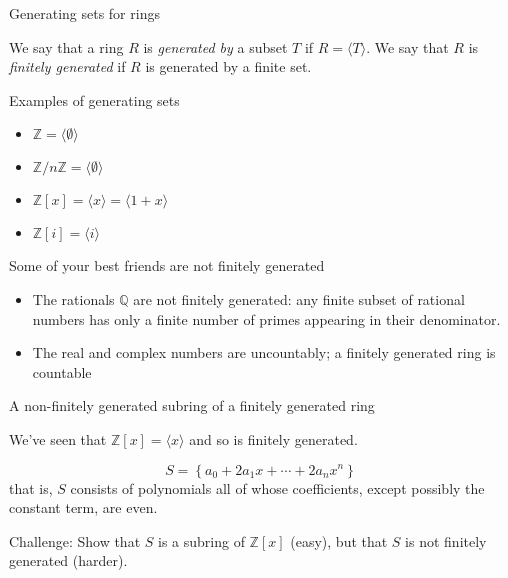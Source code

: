 \documentclass{beamer}
\begin{document}
\begin{frame}{Generating sets for rings}

\begin{definition}
We say that a ring $R$ is \emph{generated by} a subset $T$ if $R=\langle T\rangle$.  We say that $R$ is \emph{finitely generated} if $R$ is generated by a finite set.
\end{definition}

\end{frame}


\begin{frame}{Examples of generating sets}
\begin{itemize}
\item $\mathbb{Z}=\langle\emptyset\rangle $
\item $\mathbb{Z}/n\mathbb{Z}=\langle \emptyset \rangle $
\item $\mathbb{Z}[x]=\langle x \rangle=\langle 1+x\rangle $
\item $\mathbb{Z}[i]=\langle i \rangle$
\end{itemize}



\end{frame}


\begin{frame}{Some of your best friends are not finitely generated}

\begin{itemize} 
\item The rationals $\mathbb{Q}$ are not finitely generated: any finite subset of rational numbers has only a finite number of primes appearing in their denominator.  
\item The real and complex numbers are uncountably; a finitely generated ring is countable
\end{itemize}
\end{frame}

\begin{frame}{A non-finitely generated subring of a finitely generated ring}


We've seen that $\mathbb{Z}[x]=\langle x\rangle$ and so is finitely generated.

$$S=\left\{ a_0+2a_1x+\cdots +2a_nx^n\right\}$$
that is, $S$ consists of polynomials all of whose coefficients, except possibly the constant term, are even.   



\begin{block}{Challenge:}
Show that $S$ is a subring of $\mathbb{Z}[x]$ (easy), but that $S$ is not finitely generated (harder).
\end{block}

\end{frame}
\end{document}
